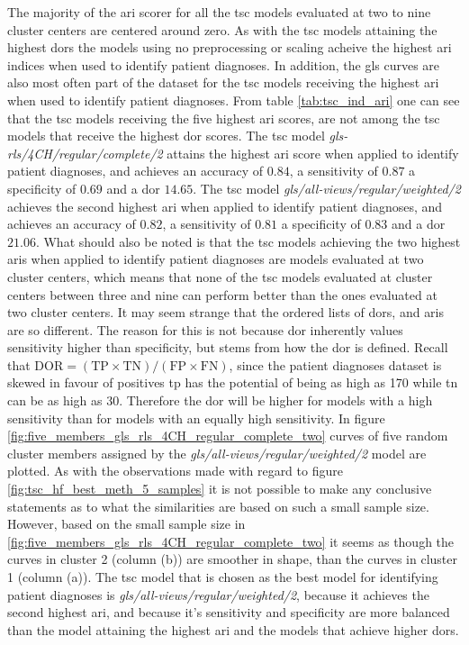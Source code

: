 The majority of the \acrshort{ari} scorer for all the \acrshort{tsc} models evaluated at two to nine cluster centers are centered around zero.
As with the \acrshort{tsc} models attaining the highest \acrshort{dor}s the models using no preprocessing or scaling acheive the highest \acrshort{ari} indices when used to identify patient diagnoses.
In addition, the \acrshort{gls} curves are also most often part of the dataset for the \acrshort{tsc} models receiving the highest \acrshort{ari} when used to identify patient diagnoses.
From table \ref{tab:tsc_ind_ari} one can see that the \acrshort{tsc} models receiving the five highest \acrshort{ari} scores, are not among the \acrshort{tsc} models that receive the highest \acrshort{dor} scores. 
The \acrshort{tsc} model \textit{gls-rls/4CH/regular/complete/2} attains the highest \acrshort{ari} score when applied to identify patient diagnoses, and achieves an 
accuracy of $0.84$, a sensitivity of $0.87$ a specificity of $0.69$ and a \acrshort{dor} $14.65$. 
The \acrshort{tsc} model \textit{gls/all-views/regular/weighted/2} achieves the second highest \acrshort{ari} when applied to identify patient diagnoses, and achieves an
accuracy of $0.82$, a sensitivity of $0.81$ a specificity of $0.83$ and a \acrshort{dor} $21.06$. 
What should also be noted is that the \acrshort{tsc} models achieving the two highest \acrshort{ari}s when applied to identify patient diagnoses are models evaluated at two cluster centers,
which means that none of the \acrshort{tsc} models evaluated at cluster centers between three and nine can perform better than the ones evaluated at two cluster centers.
It may seem strange that the ordered lists of \acrshort{dor}s, and \acrshort{ari}s are so different. 
The reason for this is not because \acrshort{dor} inherently values sensitivity higher than specificity, but stems from how the \acrshort{dor} is defined. 
Recall that $\mathrm{DOR = ( TP \times TN )/ (FP \times FN)}$, since the patient diagnoses dataset is skewed in favour of positives \acrshort{tp} has the potential of being as high as 170 
while \acrshort{tn} can be as high as 30. 
Therefore the \acrshort{dor} will be higher for models with a high sensitivity than for models with an equally high sensitivity.
In figure \ref{fig:five_members_gls_rls_4CH_regular_complete_two} curves of five random cluster members assigned by the \textit{gls/all-views/regular/weighted/2} model are plotted.
As with the observations made with regard to figure \ref{fig:tsc_hf_best_meth_5_samples} it is not possible to make any conclusive statements as to what the similarities are
based on such a small sample size.
However, based on the small sample size in \ref{fig:five_members_gls_rls_4CH_regular_complete_two} it seems as though the curves in cluster 2 (column (b)) are smoother in shape,
than the curves in cluster 1 (column (a)).
The \acrshort{tsc} model that is chosen as the best model for identifying patient diagnoses is \textit{gls/all-views/regular/weighted/2}, because it achieves the second highest \acrshort{ari}, and
because it's sensitivity and specificity are more balanced than the model attaining the highest \acrshort{ari} and the models that achieve higher \acrshort{dor}s.

